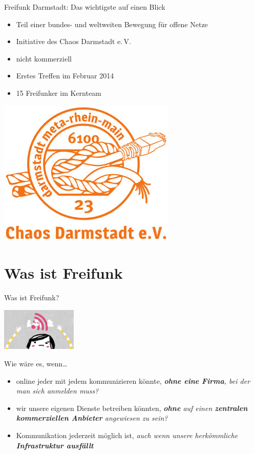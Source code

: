 \documentclass[10pt]{beamer}
\begin{document}
  \begin{frame}{Freifunk Darmstadt: Das wichtigste auf einen Blick}
    \begin{center}
    \begin{itemize}
	  \item Teil einer bundes- und weltweiten Bewegung für offene Netze
	  \item Initiative des Chaos Darmstadt e.\,V.
	  \item nicht kommerziell
	  \item Erstes Treffen im Februar 2014
      \item 15 Freifunker im Kernteam
    \end{itemize}
    \vfill
    \includegraphics[width=.3\textheight]{images/cda}
    \end{center}
  \end{frame}


  \section{Was ist Freifunk}

  \begin{frame}{Was ist Freifunk?}
      \begin{center}
        \includegraphics[width=3.6cm]{images/up}
      \end{center}
      Wie wäre es, wenn\ldots
      \begin{itemize}
        \pause
        \item online jeder mit jedem kommunizieren könnte\pause, \textit{\textbf{ohne eine Firma}, bei der man sich anmelden muss?}
        \pause
        \item wir unsere eigenen Dienste betreiben könnten\pause,  \textit{\textbf{ohne} auf einen \textbf{zentralen kommerziellen Anbieter} angewiesen zu sein?}
        \pause
        \item Kommunikation jederzeit möglich ist\pause, \textit{auch wenn unsere herkömmliche \textbf{Infrastruktur ausfällt}}
      \end{itemize}
    \end{frame}
\end{document}

